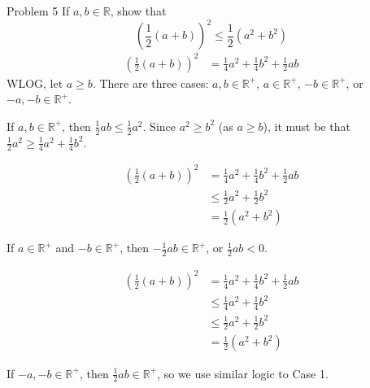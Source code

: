 \documentclass[10pt]{extarticle}
\newcommand{\R}{\mathbb{R}}
\begin{document}
  \begin{problem}{Problem 5}
    If $a,b\in \R$, show that
    \[
      \left(\frac{1}{2}(a+b)\right)^2 \leq \frac{1}{2}(a^2 + b^2)
    \] 
    \tcblower
    \begin{align*}
      \left(\frac{1}{2}(a+b)\right)^2 &= \frac{1}{4}a^2 + \frac{1}{4}b^2 + \frac{1}{2}ab
    \end{align*}
    WLOG, let $a \geq b$. There are three cases: $a,b\in\R^+$, $a\in\R^+$, $-b\in \R^+$, or $-a,-b\in \R^+$.
    \begin{description}[font=\scshape]
      \item[Case 1:] If $a,b\in \R^+$, then $\frac{1}{2}ab \leq \frac{1}{2}a^2$. Since $a^2 \geq b^2$ (as $a \geq b$), it must be that $\frac{1}{2}a^2 \geq \frac{1}{4}a^2 + \frac{1}{4}b^2$.
    \end{description} 
    \begin{align*}
      \left(\frac{1}{2}(a+b)\right)^2 &= \frac{1}{4}a^2 + \frac{1}{4}b^2 + \frac{1}{2}ab\\
                                      &\leq \frac{1}{2}a^2 + \frac{1}{2}b^2\\
                                      &= \frac{1}{2}(a^2 + b^2)
    \end{align*}
    \begin{description}[font=\scshape]
      \item[Case 2:] If $a\in \R^+$ and $-b\in\R^+$, then $-\frac{1}{2}ab\in\R^+$, or $\frac{1}{2}ab < 0$.
    \end{description}
    \begin{align*}
      \left(\frac{1}{2}(a+b)\right)^2 &= \frac{1}{4}a^2 + \frac{1}{4}b^2 + \frac{1}{2}ab\\
                                      &\leq \frac{1}{4}a^2 + \frac{1}{4}b^2\\
                                      &\leq \frac{1}{2}a^2 + \frac{1}{2}b^2\\
                                      &= \frac{1}{2}(a^2 + b^2)
    \end{align*}
    \begin{description}[font=\scshape]
      \item[Case 3:] If $-a,-b\in \R^+$, then $\frac{1}{2}ab \in\R^+$, so we use similar logic to Case 1.
    \end{description}
  \end{problem}
\end{document}
